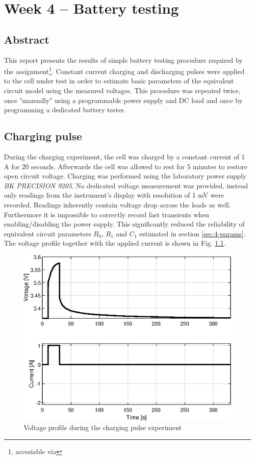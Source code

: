 \chapter{Week 4 -- Battery testing}
\section{Abstract}
This report presents the results of simple battery testing procedure required by the assignment\footnote{accesiable via \vomihwassignment}. Constant current charging and discharging pulses were applied to the cell under test in order to estimate basic parameters of the equivalent circuit model using the measured voltages. This procedure was repeated twice, once "manually" using a programmable power supply and DC load and once by programming a dedicated battery tester.

\section{Charging pulse}

During the charging experiment, the cell was charged by a constant current of 1 A for 20 seconds. Afterwards the cell was allowed to rest for 5 minutes to restore open circuit voltage. Charging was performed using the 
laboratory power supply \textit{BK PRECISION 9205}. No dedicated voltage measurement was provided, instead
only readings from the instrument's display with resolution of 1 mV were recorded. Readings inherently contain
voltage drop across the leads as well. Furthermore it is impossible to correctly record fast transients when enabling/disabling the power supply.
This significantly reduced the reliability of equivalent circuit parameters $R_0$, $R_1$ and $C_1$ estimated in section \ref{sec:4-params}.
The voltage profile together with the applied current is shown in Fig. \ref{fig:4-charging}.

\begin{figure}[htbp]
    \centering
    \includegraphics{figures/4/charge.eps}
    \caption{Voltage profile during the charging pulse experiment}
    \label{fig:4-charging}
\end{figure}

